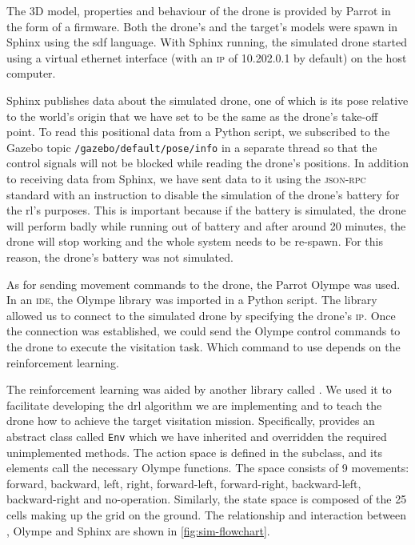 \documentclass[../main.tex]{subfiles}
\begin{document}
The 3D model, properties and behaviour
of the \anafi drone is provided by Parrot in the 
form of a firmware. 
Both the drone's and the target's models were spawn
in Sphinx using the \gls{sdf} language.
With Sphinx running, the simulated \anafi drone 
started using
a virtual ethernet interface 
(with an \textsc{ip} of 10.202.0.1 by default) 
on the host computer.

Sphinx publishes data about the simulated drone,
one of which is its pose relative to
the world's origin that we have set to be the same
as the drone's take-off point. 
To read this positional data from a Python script, we 
subscribed to the Gazebo topic 
\texttt{/gazebo\-/default\-/pose\-/info}
in a separate thread so that the control signals
will not be blocked while reading the drone's positions.
In addition to receiving data from Sphinx, we have 
sent data to it using the \textsc{json-rpc} standard
with an instruction to disable
the simulation of the \anafi drone's battery
for the \gls{rl}'s purposes. This is important because
if the battery is simulated, the drone will 
perform badly while running
out of battery and after around 20 minutes, 
the drone will stop working and the whole system
needs to be re-spawn. For this reason, the drone's
battery was not simulated.

As for sending movement commands to the drone,
the Parrot Olympe was used.
In an \textsc{ide}, the Olympe library was imported
in a Python script. The library allowed us to connect
to the simulated drone by specifying the drone's
\textsc{ip}. Once the connection was established, 
we could send the Olympe control commands to the drone
to execute the visitation task. Which command to use
depends on the reinforcement learning.

The reinforcement learning was aided 
by another library called \gym.
We used it to facilitate developing the
\gls{drl} algorithm we are implementing and to 
teach the drone how to achieve the 
target visitation mission.
Specifically, \gym provides an abstract class 
called \texttt{Env}
which we have inherited and overridden the 
required unimplemented methods.
The action space is defined in the subclass, and its
elements call the necessary Olympe functions. 
The space consists of 9 movements: 
forward, backward, left,
right, forward-left, forward-right, backward-left,
backward-right and no-operation.
Similarly, the state space is composed of the 25 cells
making up the grid on the ground. 
The relationship and interaction between \gym, Olympe
and Sphinx are shown in \cref{fig:sim-flowchart}.
\end{document}
